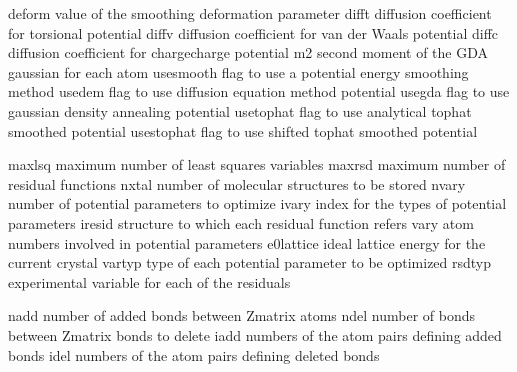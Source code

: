 \documentclass[letterpaper,11pt,english]{sphinxmanual}
\begin{document}

\begin{sphinxVerbatim}[commandchars=\\\{\}]
deform          value of the smoothing deformation parameter
difft           diffusion coefficient for torsional potential
diffv           diffusion coefficient for van der Waals potential
diffc           diffusion coefficient for charge\PYGZhy{}charge potential
m2              second moment of the GDA gaussian for each atom
use\PYGZus{}smooth      flag to use a potential energy smoothing method
use\PYGZus{}dem         flag to use diffusion equation method potential
use\PYGZus{}gda         flag to use gaussian density annealing potential
use\PYGZus{}tophat      flag to use analytical tophat smoothed potential
use\PYGZus{}stophat     flag to use shifted tophat smoothed potential
\end{sphinxVerbatim}


\begin{sphinxVerbatim}[commandchars=\\\{\}]
maxlsq          maximum number of least squares variables
maxrsd          maximum number of residual functions
nxtal           number of molecular structures to be stored
nvary           number of potential parameters to optimize
ivary           index for the types of potential parameters
iresid          structure to which each residual function refers
vary            atom numbers involved in potential parameters
e0\PYGZus{}lattice      ideal lattice energy for the current crystal
vartyp          type of each potential parameter to be optimized
rsdtyp          experimental variable for each of the residuals
\end{sphinxVerbatim}


\begin{sphinxVerbatim}[commandchars=\\\{\}]
nadd            number of added bonds between Z\PYGZhy{}matrix atoms
ndel            number of bonds between Z\PYGZhy{}matrix bonds to delete
iadd            numbers of the atom pairs defining added bonds
idel            numbers of the atom pairs defining deleted bonds
\end{sphinxVerbatim}
\end{document}
